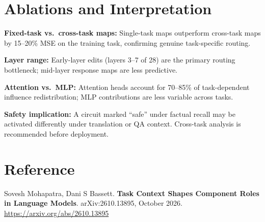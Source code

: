 \documentclass[10pt,twocolumn]{article}
\begin{document}
\section{Ablations and Interpretation}

\textbf{Fixed-task vs.\ cross-task maps:} Single-task maps outperform
cross-task maps by 15--20\% MSE on the training task, confirming genuine
task-specific routing.

\textbf{Layer range:} Early-layer edits (layers 3--7 of 28) are the primary
routing bottleneck; mid-layer response maps are less predictive.

\textbf{Attention vs.\ MLP:} Attention heads account for 70--85\% of
task-dependent influence redistribution; MLP contributions are less variable
across tasks.

\textbf{Safety implication:} A circuit marked ``safe'' under factual recall may
be activated differently under translation or QA context. Cross-task analysis
is recommended before deployment.

\section*{Reference}

Sovesh Mohapatra, Dani S Bassett.
\textbf{Task Context Shapes Component Roles in Language Models}.
arXiv:2610.13895, October 2026.\\
\url{https://arxiv.org/abs/2610.13895}
\end{document}
